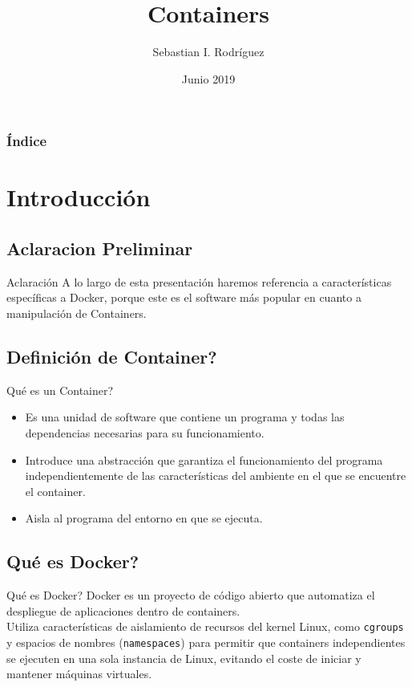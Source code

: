\documentclass{beamer}
\title{Containers}
\author[S. I. Rodríguez]{Sebastian I. Rodríguez}
\institute
{
  Instituto Politécnico Superior Gral. San Martín
}
\date{Junio 2019}
\begin{document}
\begin{frame}
  \titlepage
\end{frame}

\begin{frame}[allowframebreaks]
  \frametitle{Índice}
  
	\tableofcontents
 

\end{frame}

\section{Introducción}

\subsection{Aclaracion Preliminar}

\begin{frame}{Aclaración}
	A lo largo de esta presentación haremos referencia a características específicas a Docker, porque este es el software más popular en cuanto a manipulación de Containers.
\end{frame}

\subsection{Definición de Container?}

\begin{frame}{Qué es un Container?}

  \begin{itemize}
  \item
    Es una unidad de software que contiene un programa y todas las dependencias necesarias para su funcionamiento.
  \item
   Introduce una abstracción que garantiza el funcionamiento del programa independientemente de las características del ambiente en el que se encuentre el container.
  \item 
  Aisla al programa del entorno en que se ejecuta.
  \end{itemize}
\end{frame}

\subsection{Qué es Docker?}

\begin{frame}{Qué es Docker?}
	\hspace{1cm} Docker es un proyecto de código abierto que automatiza el despliegue de aplicaciones dentro de containers. \\
	\vspace{0.5cm}
	\hspace{1cm} Utiliza características de aislamiento de recursos del kernel Linux, como \texttt{cgroups} y espacios de nombres (\texttt{namespaces}) para permitir que containers independientes se ejecuten en una sola instancia de Linux, evitando el coste de iniciar y mantener máquinas virtuales.
\end{frame}
\end{document}

